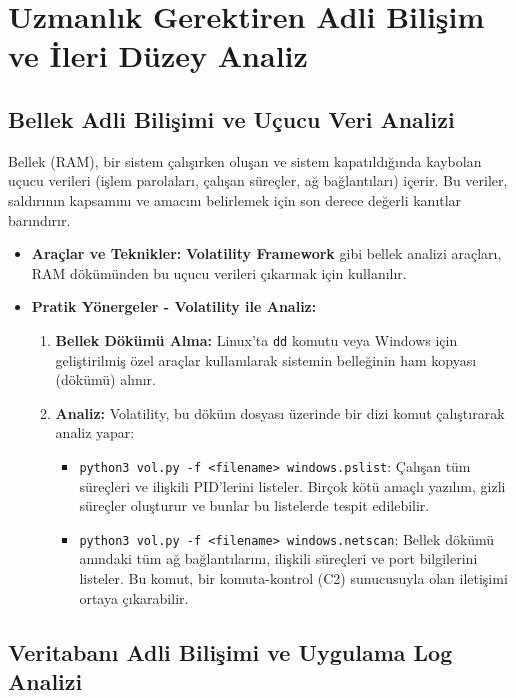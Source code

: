 \section{Uzmanlık Gerektiren Adli Bilişim ve İleri Düzey Analiz}

\subsection{Bellek Adli Bilişimi ve Uçucu Veri Analizi}

Bellek (RAM), bir sistem çalışırken oluşan ve sistem kapatıldığında kaybolan uçucu verileri (işlem parolaları, çalışan süreçler, ağ bağlantıları) içerir. Bu veriler, saldırının kapsamını ve amacını belirlemek için son derece değerli kanıtlar barındırır.

\begin{itemize}
    \item \textbf{Araçlar ve Teknikler:} \textbf{Volatility Framework} gibi bellek analizi araçları, RAM dökümünden bu uçucu verileri çıkarmak için kullanılır.
    \item \textbf{Pratik Yönergeler - Volatility ile Analiz:}
    \begin{enumerate}
        \item \textbf{Bellek Dökümü Alma:} Linux'ta \texttt{dd} komutu veya Windows için geliştirilmiş özel araçlar kullanılarak sistemin belleğinin ham kopyası (dökümü) alınır.
        \item \textbf{Analiz:} Volatility, bu döküm dosyası üzerinde bir dizi komut çalıştırarak analiz yapar:
        \begin{itemize}
            \item \texttt{python3 vol.py -f \textless{}filename\textgreater{} windows.pslist}: Çalışan tüm süreçleri ve ilişkili PID'lerini listeler. Birçok kötü amaçlı yazılım, gizli süreçler oluşturur ve bunlar bu listelerde tespit edilebilir.
            \item \texttt{python3 vol.py -f \textless{}filename\textgreater{} windows.netscan}: Bellek dökümü anındaki tüm ağ bağlantılarını, ilişkili süreçleri ve port bilgilerini listeler. Bu komut, bir komuta-kontrol (C2) sunucusuyla olan iletişimi ortaya çıkarabilir.
        \end{itemize}
    \end{enumerate}
\end{itemize}

\subsection{Veritabanı Adli Bilişimi ve Uygulama Log Analizi}

